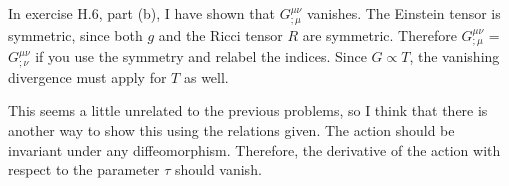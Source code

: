 \subsection{}

In exercise H.6, part (b), I have shown that $G^{\mu\nu}_{;\mu}$ vanishes. The
Einstein tensor is symmetric, since both $g$ and the Ricci tensor $R$ are
symmetric. Therefore $G^{\mu\nu}_{;\mu}$ = $G^{\mu\nu}_{;\nu}$ if you use the
symmetry and relabel the indices. Since $G \propto T$, the
vanishing divergence must apply for $T$ as well.

This seems a little unrelated to the previous problems, so I think that there
is another way to show this using the relations given. The action should be
invariant under any diffeomorphism. Therefore, the derivative of the action
with respect to the parameter $\tau$ should vanish.

\IfFileExists{\bibliographyfile}{
    \printbibliography
}{}




